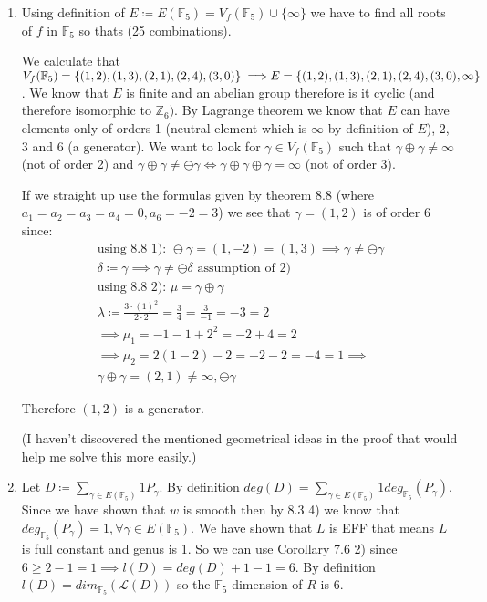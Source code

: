 \documentclass[12pt, a4paper]{article}
\begin{document}
\begin{enumerate}[label=(\alph*)]
\item Using definition of $E \coloneqq E(\mathbb{F}_5) = V_f(\mathbb{F}_5) \cup \{\infty\}$ we have to find all roots of $f$ in $\mathbb{F}_5$ so thats (25 combinations). 

We calculate that $V_f(\mathbb{F}_5) = \{(1,2),(1,3),(2,1),(2,4),(3,0)\} \implies \\E = \{(1,2),(1,3),(2,1),(2,4),(3,0),\infty\}$. We know that $E$ is finite and an abelian group therefore is it cyclic (and therefore isomorphic to $\mathbb{Z}_6)$. By Lagrange theorem  we know that $E$ can have elements only of orders 1 (neutral element which is $\infty$ by definition of $E$), 2, 3 and 6 (a generator). We want to look for $\gamma \in V_f(\mathbb{F}_5)$ such that $\gamma \oplus \gamma \neq \infty$ (not of order 2) and $\gamma \oplus \gamma \neq \ominus \gamma \iff \gamma \oplus \gamma \oplus \gamma = \infty$ (not of order 3).

If we straight up use the formulas given by theorem 8.8 (where $a_1=a_2=a_3=a_4 = 0, a_6 = -2=3$)  we see that $\gamma = (1,2)$ is of order 6 since:
\begin{gather*}
\text{using 8.8 1): }\ominus \gamma = (1, -2) = (1,3) \implies  \gamma \neq \ominus \gamma\\
\delta \coloneqq \gamma \implies \gamma \neq \ominus \delta \text{ assumption of 2)}\\
\text{using 8.8 2): } \mu = \gamma \oplus \gamma\\
\lambda \coloneqq \frac{3 \cdot (1)^2}{2 \cdot 2} = \frac{3}{4} = \frac{3}{-1} = -3 = 2\\
\implies \mu_1 = -1-1+2^2 = -2+4 = 2 \\
\implies \mu_2 = 2(1-2)-2 = -2 - 2 = - 4 = 1 \implies\\
\gamma \oplus \gamma = (2,1) \neq \infty,\ominus \gamma
\end{gather*}

Therefore $(1,2)$ is a generator.

(I haven't discovered the mentioned geometrical ideas in the proof that would help me solve this more easily.)

\item Let $D \coloneqq \sum_{\gamma \in E(\mathbb{F}_5)} 1P_\gamma$. By definition $deg(D) = \sum_{\gamma \in E(\mathbb{F}_5)}1 deg_{\mathbb{F}_5}(P_\gamma)$. Since we have shown that $w$ is smooth then by 8.3 4) we know that $deg_{\mathbb{F}_5}(P_\gamma) = 1, \forall \gamma \in E(\mathbb{F}_5)$. We have shown that $L$ is EFF that means $L$ is full constant and genus is 1. So we can use Corollary 7.6 2) since $6 \geq 2 - 1 = 1 \implies l(D) = deg(D) + 1 - 1 = 6$. By definition $l(D) = dim_{\mathbb{F}_5}(\mathcal{L}(D))$ so the $\mathbb{F}_5$-dimension of $R$ is 6.


\end{enumerate}
\end{document}
